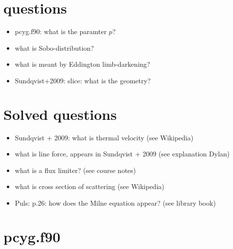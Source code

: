 \documentclass[10pt,a4paper]{article}
\begin{document}
\section{questions}
\begin{itemize}
\item pcyg.f90: what is the paramter $p$?
\item what is Sobo-distribution?
\item what is meant by Eddington limb-darkening?

\item Sundqvist+2009: slice: what is the geometry?
\end{itemize}

\section{Solved questions}
\begin{itemize}
\item Sundqvist + 2009: what is thermal velocity (see Wikipedia)
\item what is line force, appears in Sundqvist + 2009 (see explanation Dylan)
\item what is a flux limiter? (see course notes)
\item what is cross section of scattering (see Wikipedia)
\item Puls: p.26: how does the Milne equation appear? (see library book)
\end{itemize}

\newpage
\section{pcyg.f90}
\end{document}
